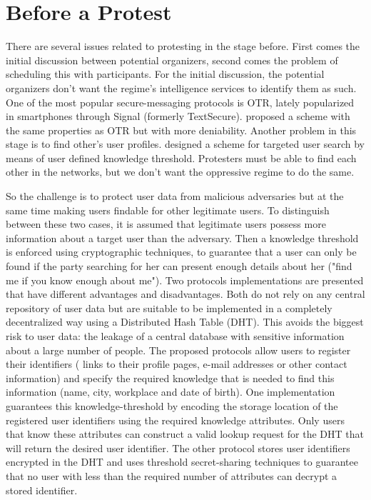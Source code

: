 \section{Before a Protest}
\label{BeforeProtest}

There are several issues related to protesting in the stage before.
First comes the initial discussion between potential organizers, second comes 
the problem of scheduling this with participants.
For the initial discussion, the potential organizers don't want the regime's 
intelligence services to identify them as such.
One of the most popular secure-messaging protocols is \ac{OTR}, lately 
popularized in smartphones through Signal (formerly TextSecure).
\citet{OTPKX} proposed a scheme with the same properties as \ac{OTR} but with 
more deniability.
Another problem in this stage is to find other's user profiles.
\citet{ThresholdUserSearch} designed a scheme for targeted user search by means 
of user defined knowledge threshold.
Protesters must be able to find each other in the networks, but we don't want 
the oppressive regime to do the same.


So the challenge is to protect user data from malicious adversaries but
at the same time making users findable for other legitimate users. To
distinguish between these two cases, it is assumed that legitimate users
possess more information about a target user than the adversary. Then a
knowledge threshold is enforced using cryptographic techniques, to
guarantee that a user can only be found if the party searching for her
can present enough details about her ("find me if you know enough about
me"). Two protocols implementations are presented that have different
advantages and disadvantages. Both do not rely on any central repository
of user data but are suitable to be implemented in a completely
decentralized way using a Distributed Hash Table (DHT). This avoids the
biggest risk to user data: the leakage of a central database with
sensitive information about a large number of people.
The proposed protocols allow users to register their identifiers (\eg
links to their profile pages, e-mail addresses or other contact
information) and specify the required knowledge that is needed to find
this information (\eg name, city, workplace and date of birth). One
implementation guarantees this knowledge-threshold by encoding the
storage location of the registered user identifiers using the required
knowledge attributes. Only users that know these attributes can
construct a valid lookup request for the DHT that will return the
desired user identifier. The other protocol stores user identifiers
encrypted in the DHT and uses threshold secret-sharing techniques to
guarantee that no user with less than the required number of attributes
can decrypt a stored identifier.

